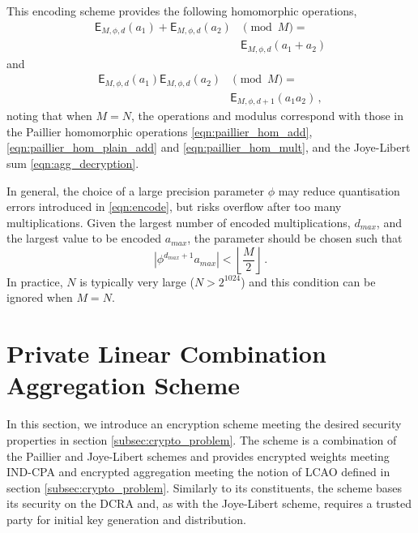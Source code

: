 \documentclass[10pt,letterpaper,oneside,twocolumn,journal]{IEEEtran}
\theoremstyle{definition}
\theoremstyle{definition}
\theoremstyle{remark}
\begin{document}
This encoding scheme provides the following homomorphic operations,
\begin{equation}
    \begin{split}
        \mathsf{E}_{M,\phi,d}(a_1) + \mathsf{E}_{M,\phi,d}(a_2)& \pmod{M} =\\
        &\mathsf{E}_{M,\phi,d}(a_1+a_2)
    \end{split}\label{eqn:encoding_homomorphic_add}
\end{equation}
and
\begin{equation}
    \begin{split}
        \mathsf{E}_{M,\phi,d}(a_1)\mathsf{E}_{M,\phi,d}(a_2)& \pmod{M} =\\
        &\mathsf{E}_{M,\phi,d+1}(a_1a_2)\,,
    \end{split}
\end{equation}
noting that when $M=N$, the operations and modulus correspond with those in the Paillier homomorphic operations \eqref{eqn:paillier_hom_add}, \eqref{eqn:paillier_hom_plain_add} and \eqref{eqn:paillier_hom_mult}, and the Joye-Libert sum \eqref{eqn:agg_decryption}.

In general, the choice of a large precision parameter $\phi$ may reduce quantisation errors introduced in \eqref{eqn:encode}, but risks overflow after too many multiplications. Given the largest number of encoded multiplications, $d_{max}$, and the largest value to be encoded $a_{max}$, the parameter should be chosen such that
\begin{equation}
    \left|\phi^{d_{max}+1}a_{max}\right| < \left\lfloor \frac{M}{2} \right\rfloor\,.
\end{equation}
In practice, $N$ is typically very large ($N>2^{1024}$) and this condition can be ignored when $M=N$.

% 
%                                            
%                                            
%                                            
% 

\section{Private Linear Combination Aggregation Scheme} \label{sec:lcao_scheme}
In this section, we introduce an encryption scheme meeting the desired security properties in section \ref{subsec:crypto_problem}. The scheme is a combination of the Paillier and Joye-Libert schemes and provides encrypted weights meeting IND-CPA and encrypted aggregation meeting the notion of LCAO defined in section \ref{subsec:crypto_problem}. Similarly to its constituents, the scheme bases its security on the DCRA and, as with the Joye-Libert scheme, requires a trusted party for initial key generation and distribution. 
\end{document}
